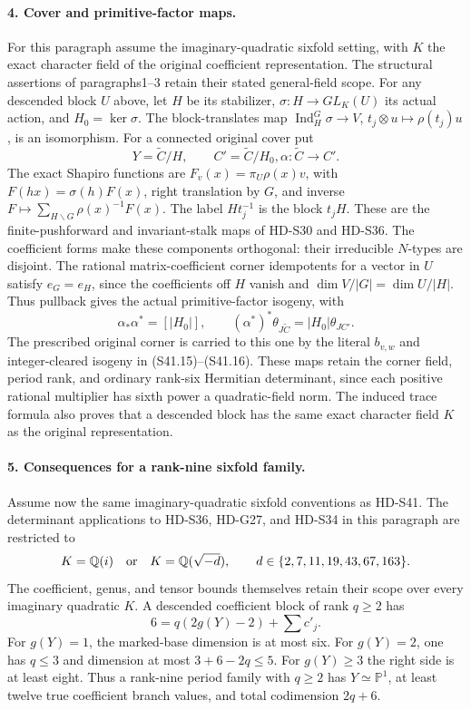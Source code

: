 \paragraph{4. Cover and primitive-factor maps.}
For this paragraph assume the imaginary-quadratic sixfold
setting, with \(K\) the exact character field of the
original coefficient representation. The structural assertions
of paragraphs1--3 retain their stated general-field scope.
For any descended block \(U\) above, let \(H\) be its
stabilizer, \(\sigma:H\to GL_K(U)\) its actual action,
and \(H_0=\ker\sigma\). The block-translates map
\(\operatorname{Ind}_H^G\sigma\to V\),
\(t_j\otimes u\mapsto\rho(t_j)u\), is an isomorphism.
For a connected original cover put
\[
       Y=\widetilde C/H,\qquad C'=\widetilde C/H_0,
                         \alpha:\widetilde C\to C'.        \tag{S42.12}
\]
The exact Shapiro functions are
\(F_v(x)=\pi_U\rho(x)v\), with
\(F(hx)=\sigma(h)F(x)\), right translation by \(G\),
and inverse \(F\mapsto\sum_{H\backslash G}\rho(x)^{-1}F(x)\).
The label \(Ht_j^{-1}\) is the block \(t_jH\).
These are the finite-pushforward and invariant-stalk maps of
HD-S30 and HD-S36. The coefficient forms make these components
orthogonal: their irreducible \(N\)-types are disjoint.
The rational matrix-coefficient corner idempotents for a vector
in \(U\) satisfy \(e_G=e_H\), since the coefficients
off \(H\) vanish and
\(\dim V/|G|=\dim U/|H|\). Thus pullback gives the actual
primitive-factor isogeny, with
\[
       \alpha_*\alpha^*=[|H_0|],\qquad
       (\alpha^*)^*\theta_{J\widetilde C}=|H_0|\theta_{JC'}.
                                                               \tag{S42.13}
\]
The prescribed original corner is carried to this one by the
literal \(b_{v,w}\) and integer-cleared isogeny in
(S41.15)--(S41.16). These maps retain the corner field,
period rank, and ordinary rank-six Hermitian determinant,
since each positive rational multiplier has sixth power a
quadratic-field norm. The induced trace formula also proves
that a descended block has the same exact character field
\(K\) as the original representation.

\paragraph{5. Consequences for a rank-nine sixfold family.}
Assume now the same imaginary-quadratic sixfold conventions
as HD-S41. The determinant applications to HD-S36, HD-G27,
and HD-S34 in this paragraph are restricted to
\[
 K=\mathbb Q(i)\quad\hbox{or}\quad
 K=\mathbb Q(\sqrt{-d}),\qquad
 d\in\{2,7,11,19,43,67,163\}.
\]
The coefficient, genus, and tensor bounds themselves retain
their scope over every imaginary quadratic \(K\).
A descended coefficient block of rank \(q\ge2\)
has
\[
                6=q(2g(Y)-2)+\sum c'_j.                   \tag{S42.14}
\]
For \(g(Y)=1\), the marked-base dimension is at most six.
For \(g(Y)=2\), one has \(q\le3\) and dimension at
most \(3+6-2q\le5\). For \(g(Y)\ge3\) the right
side is at least eight. Thus a rank-nine period family with
\(q\ge2\) has \(Y\simeq\mathbb P^1\), at least
twelve true coefficient branch values, and total codimension
\(2q+6\).

